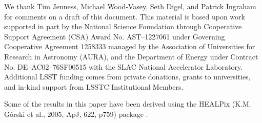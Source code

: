 \documentclass[]{spie}
\begin{document}
\acknowledgments        
 
We thank Tim Jenness, Michael Wood-Vasey, Seth Digel, and Patrick Ingraham for comments on a draft of this document.  This material is based upon work supported in part by the National Science Foundation through Cooperative Support Agreement (CSA) Award No. AST–1227061 under Governing Cooperative Agreement 1258333 managed by the Association of Universities for Research in Astronomy (AURA), and the Department of Energy under Contract No. DE–AC02–76SF00515 with the SLAC National Accelerator Laboratory. Additional LSST funding comes from private donations, grants to universities, and in-kind support from LSSTC Institutional Members.

Some of the results in this paper have been derived using the HEALPix (K.M. G{\'o}rski et al., 2005, ApJ, 622, p759) package \cite{Gorski05}.



\end{document}
